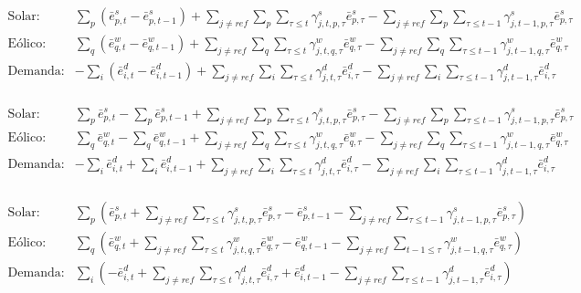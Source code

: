 \begin{align*}
    \text{Solar:} & \sum_{p} \left ( \bar{e}^{s}_{p,t} - \bar{e}^{s}_{p,t-1} \right ) + \sum_{j\neq{ref}}\sum_{p} \sum_{\tau \leqslant  t}\gamma^{s}_{j, t, p, \tau}\bar{e}^{s}_{p,\tau} - \sum_{j\neq{ref}}\sum_{p} \sum_{\tau \leqslant  t-1}\gamma^{s}_{j, t-1, p, \tau}\bar{e}^{s}_{p,\tau}  \\
    \text{Eólico:} &  \sum_{q} \left ( \bar{e}^{w}_{q,t} - \bar{e}^{w}_{q,t-1} \right) + \sum_{j\neq{ref}}\sum_{q} \sum_{\tau \leqslant  t}\gamma^{w}_{j, t, q, \tau} \bar{e}^{w}_{q,\tau} - \sum_{j\neq{ref}}\sum_{q} \sum_{\tau \leqslant  t-1}\gamma^{w}_{j, t-1, q, \tau} \bar{e}^{w}_{q,\tau} \\
    \text{Demanda:} & - \sum_{i} \left ( \bar{e}^{d}_{i, t} - \bar{e}^{d}_{i, t-1} \right ) + \sum_{j\neq{ref}}\sum_{i} \sum_{\tau \leqslant  t}\gamma^{d}_{j, t,\tau}\bar{e}^{d}_{i,\tau} - \sum_{j\neq{ref}}\sum_{i} \sum_{\tau \leqslant  t-1}\gamma^{d}_{j, t-1,\tau}\bar{e}^{d}_{i,\tau} \\
\end{align*}

\begin{align*}
    \text{Solar:} & \sum_{p} \bar{e}^{s}_{p,t} - \sum_{p}\bar{e}^{s}_{p,t-1} + \sum_{j\neq{ref}}\sum_{p} \sum_{\tau \leqslant  t}\gamma^{s}_{j, t, p, \tau}\bar{e}^{s}_{p,\tau} - \sum_{j\neq{ref}}\sum_{p} \sum_{\tau \leqslant  t-1}\gamma^{s}_{j, t-1, p, \tau}\bar{e}^{s}_{p,\tau}  \\
    \text{Eólico:} & \sum_{q} \bar{e}^{w}_{q,t} - \sum_{q}\bar{e}^{w}_{q,t-1} + \sum_{j\neq{ref}}\sum_{q} \sum_{\tau \leqslant  t}\gamma^{w}_{j, t, q, \tau} \bar{e}^{w}_{q,\tau} - \sum_{j\neq{ref}}\sum_{q} \sum_{\tau \leqslant  t-1}\gamma^{w}_{j, t-1, q, \tau} \bar{e}^{w}_{q,\tau} \\
    \text{Demanda:} & - \sum_{i} \bar{e}^{d}_{i, t} + \sum_{i} \bar{e}^{d}_{i, t-1} + \sum_{j\neq{ref}}\sum_{i} \sum_{\tau \leqslant  t}\gamma^{d}_{j, t,\tau}\bar{e}^{d}_{i,\tau} - \sum_{j\neq{ref}}\sum_{i} \sum_{\tau \leqslant  t-1}\gamma^{d}_{j, t-1,\tau}\bar{e}^{d}_{i,\tau} \\
\end{align*}

\begin{align*}
    \text{Solar:} & \sum_{p} \left ( \bar{e}^{s}_{p,t} + \sum_{j\neq{ref}}\sum_{\tau \leqslant  t}\gamma^{s}_{j, t, p, \tau}\bar{e}^{s}_{p,\tau} - \bar{e}^{s}_{p,t-1} - \sum_{j\neq{ref}}\sum_{\tau \leqslant  t-1}\gamma^{s}_{j, t-1, p, \tau}\bar{e}^{s}_{p,\tau} \right )  \\
    \text{Eólico:} & \sum_{q} \left ( \bar{e}^{w}_{q,t} + \sum_{j\neq{ref}}\sum_{\tau \leqslant  t}\gamma^{w}_{j, t, q, \tau} \bar{e}^{w}_{q,\tau} - \bar{e}^{w}_{q,t-1} - \sum_{j\neq{ref}}\sum_{t-1 \leqslant \tau}\gamma^{w}_{j, t-1, q, \tau} \bar{e}^{w}_{q,\tau} \right )\\
    \text{Demanda:} & \sum_{i} \left ( - \bar{e}^{d}_{i, t} + \sum_{j\neq{ref}}\sum_{\tau \leqslant  t}\gamma^{d}_{j, t,\tau}\bar{e}^{d}_{i,\tau} + \bar{e}^{d}_{i, t-1} - \sum_{j\neq{ref}}\sum_{\tau \leqslant  t-1}\gamma^{d}_{j, t-1,\tau}\bar{e}^{d}_{i,\tau} \right ) \\
\end{align*}

